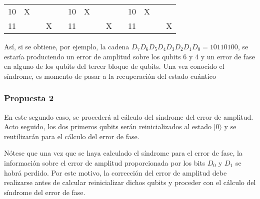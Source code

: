 \begin{table}[]
\begin{tabular}{|llll|l|llll|l|llll|}
\multicolumn{1}{|l|}{10}                           & \multicolumn{1}{l|}{X}     & \multicolumn{1}{l|}{}      &       &  & \multicolumn{1}{l|}{10}                           & \multicolumn{1}{l|}{X}       & \multicolumn{1}{l|}{}      &       &  & \multicolumn{1}{l|}{10}                           & \multicolumn{1}{l|}{X}      & \multicolumn{1}{l|}{}      &       \\ \cline{1-4} \cline{6-9} \cline{11-14} 
\multicolumn{1}{|l|}{11}                           & \multicolumn{1}{l|}{}      & \multicolumn{1}{l|}{}      & X     &  & \multicolumn{1}{l|}{11}                           & \multicolumn{1}{l|}{}        & \multicolumn{1}{l|}{}      & X     &  & \multicolumn{1}{l|}{11}                           & \multicolumn{1}{l|}{}       & \multicolumn{1}{l|}{}      & X     \\ \cline{1-4} \cline{6-9} \cline{11-14} 
\end{tabular}
\end{table}


Así, si se obtiene, por ejemplo, la cadena $D_7D_6D_5D_4D_3D_2D_1D_0 = 10110100$, se estaría produciendo un error de amplitud sobre los qubits 6 y 4 y un error de fase en alguno de los qubits del tercer bloque de qubits. Una vez conocido el síndrome, es momento de pasar a la recuperación del estado cuántico


\subsubsection{Propuesta 2}

En este segundo caso, se procederá al cálculo del síndrome del error de amplitud. Acto seguido, los dos primeros qubits serán reinicializados al estado $ | 0 \rangle $ y se reutilizarán para el cálculo del error de fase.

Nótese que una vez que se haya calculado el síndrome para el error de fase, la información sobre el error de amplitud proporcionada por los bits $D_0$ y $D_1$ se habrá perdido. Por este motivo, la corrección del error de amplitud debe realizarse antes de calcular reinicializar dichos qubits y proceder con el cálculo del síndrome del error de fase. 

